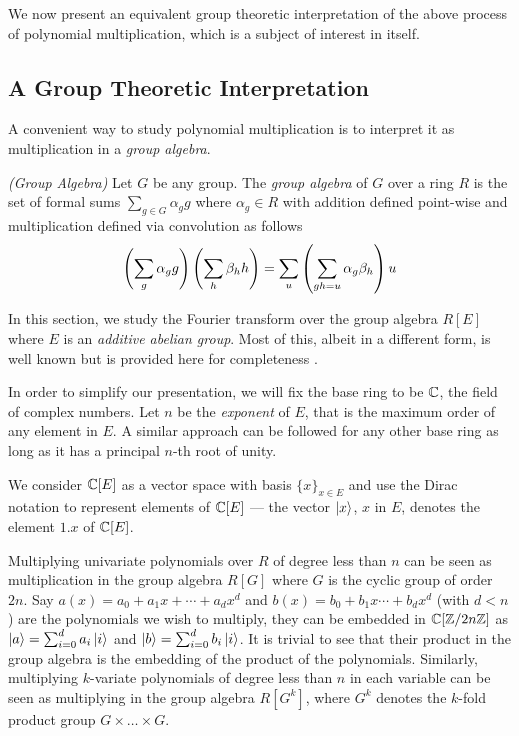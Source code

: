 \documentclass[11pt]{article}
\begin{document}
We now present an equivalent group theoretic interpretation of the
above process of polynomial multiplication, which is a subject of
interest in itself.

\subsection{A Group Theoretic Interpretation}

A convenient way to study polynomial multiplication is to interpret it
as multiplication in a \emph{group algebra}.

\begin{definition}
\emph{\textsf{(Group Algebra)}}
  Let $G$ be any group. The \emph{group algebra} of $G$ over a ring $R$ is
  the set of formal sums $\sum_{g \in G} \alpha_g g$ where $\alpha_g
  \in R$ with addition defined point-wise and multiplication defined
  via convolution as follows
  $$ \left(\sum_g \alpha_g g\right) \left(\sum_h
  \beta_h h\right) = \sum_{u}\left(\sum_{gh=u} \alpha_g \beta_h\right)u $$
\end{definition}

In this section, we study the Fourier transform over the group algebra
$R[E]$ where $E$ is an \emph{additive abelian group}. Most of this,
albeit in a different form, is well known but is provided here for
completeness \cite[Chapter 17]{Igor}.

In order to simplify our presentation, we will fix the base ring to be
$\mathbb{C}$, the field of complex numbers. Let $n$ be the \emph{exponent} of
$E$, that is the maximum order of any element in $E$. A similar
approach can be followed for any other base ring as long as it has a
principal $n$-th root of unity.

We consider $\mathbb{C}[E]$ as a vector space with basis $\{ x \}_{x \in E}$
and use the Dirac notation to represent elements of $\mathbb{C}[E]$ --- the
vector $\left| x \right\rangle$, $x$ in $E$, denotes the element $1 . x$ of $\mathbb{C}[E]$.

Multiplying univariate polynomials over $R$ of degree less than $n$
can be seen as multiplication in the group algebra $R[G]$ where $G$ is
the cyclic group of order $2n$. Say $a(x) = a_0 + a_1 x +
\cdots + a_dx^d$ and $b(x)= b_0 + b_1x \cdots + b_dx^d$ (with $d<n$)
are the polynomials we wish to multiply, they can be embedded in
$\mathbb{C}[\mathbb{Z}/2n\mathbb{Z}]$ as $\left| a \right\rangle = \sum_{i=0}^d a_i \left| i \right\rangle$ and $\left| b \right\rangle =
\sum_{i=0}^d b_i\left| i \right\rangle$. It is trivial to see that their product in
the group algebra is the embedding of the product of the
polynomials. Similarly, multiplying $k$-variate polynomials of degree
less than $n$ in each variable can be seen as multiplying in the group
algebra $R[G^k]$, where $G^k$ denotes the $k$-fold product group
$G\times\ldots \times G$.
\end{document}
